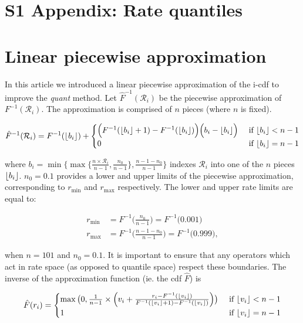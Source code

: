 \documentclass[12pt]{article}
\DeclarePairedDelimiter\floor{\lfloor}{\rfloor}
\begin{document}
\section*{S1 Appendix: Rate quantiles}


\section{Linear piecewise approximation}

In this article we introduced a linear piecewise approximation of the i-cdf to improve the \textit{quant} method. Let $\hat{F}^{-1}(\mathcal{R}_i)$ be the piecewise approximation of $F^{-1}(\mathcal{R}_i)$. The approximation is comprised of $n$ pieces (where $n$ is fixed).



\begin{align}
\hat{F}^{-1}(\mathcal{R}_i) = F^{-1}(\floor{b_i}) + \begin{cases} \Big( F^{-1}(\floor{b_i} + 1) - F^{-1}(\floor{b_i}) \Big) \Big( b_i - \floor{b_i}  \Big) &\text{ if } \floor{b_i} < n-1  \\ 0 &\text{ if } \floor{b_i} = n-1 \end{cases}
\end{align}


where $b_i = \min \{ \max\{ \frac{n \times \mathcal{R}_i}{n-1}, \frac{n_0}{n-1} \}, \frac{n - 1 -n_0}{n-1} \}$ indexes $\mathcal{R}_i$ into one of the $n$ pieces $\floor{b_i}$. $n_0 = 0.1$ provides a lower and upper limits of the piecewise approximation, corresponding to $r_\text{min}$ and $r_\text{max}$ respectively. The lower and upper rate limits are equal to:



\begin{align}
r_\text{min} &= F^{-1}\Big( \frac{n_0}{n-1}\Big) = F^{-1}\Big( 0.001 \Big) \\
r_\text{max} &= F^{-1}\Big( \frac{n - 1 -n_0}{n-1}\Big) = F^{-1}\Big( 0.999 \Big),
\end{align}

when $n=101$ and $n_0=0.1$. It is important to ensure that any operators which act in rate space (as opposed to quantile space) respect these boundaries. The inverse of the approximation function (ie. the cdf $\hat{F}$) is 


\begin{align}
\hat{F}(r_i) = \begin{cases} \max \big(0, \frac{1}{n-1} \times \Big( v_i + \frac{r_i -  F^{-1}(\floor{v_i})}{F^{-1}(\floor{v_i}+1) - F^{-1}(\floor{v_i})} \Big) \big) &\text{ if } \floor{v_i} < n-1  \\
	1 &\text{ if } \floor{v_i} = n-1 
\end{cases}
\end{align}
\end{document}
